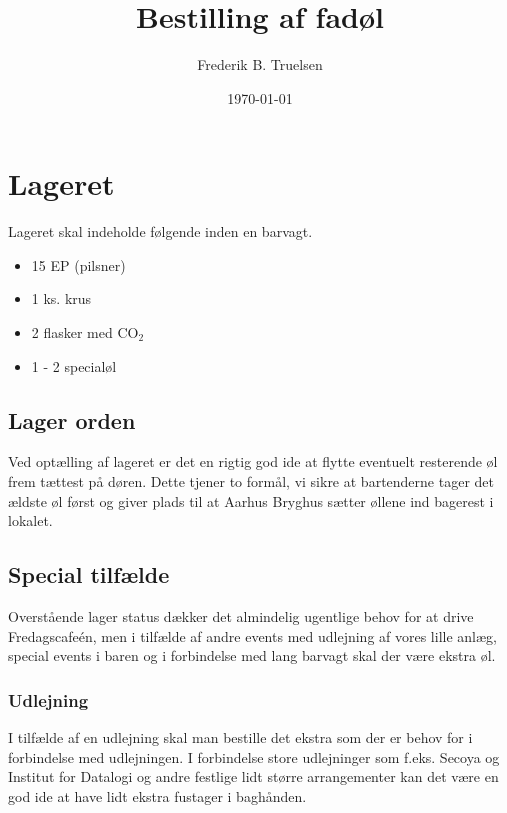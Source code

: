 

\title{Bestilling af fadøl}
\date{\today}
\author{Frederik B. Truelsen}



\maketitle

\section{Lageret}

Lageret skal indeholde følgende inden en barvagt.

\begin{itemize}
\item 15 EP (pilsner)
\item 1 ks. krus
\item 2 flasker med CO$_{2}$
\item 1 - 2 specialøl
\end{itemize} 

\subsection{Lager orden}

Ved optælling af lageret er det en rigtig god ide at flytte eventuelt resterende øl frem tættest på døren. 
Dette tjener to formål, vi sikre at bartenderne tager det ældste øl først og giver plads til at Aarhus Bryghus 
sætter øllene ind bagerest i lokalet.

\subsection{Special tilfælde}

Overstående lager status dækker det almindelig ugentlige behov for at drive Fredagscafeén,
men i tilfælde af andre events med udlejning af vores lille anlæg, special events i baren og
i forbindelse med lang barvagt skal der være ekstra øl.

\subsubsection*{Udlejning}

I tilfælde af en udlejning skal man bestille det ekstra som der er behov for i forbindelse med
udlejningen. I forbindelse store udlejninger som f.eks. Secoya og Institut for Datalogi og andre
festlige lidt større arrangementer  kan det være en god ide at have lidt ekstra fustager i baghånden.

